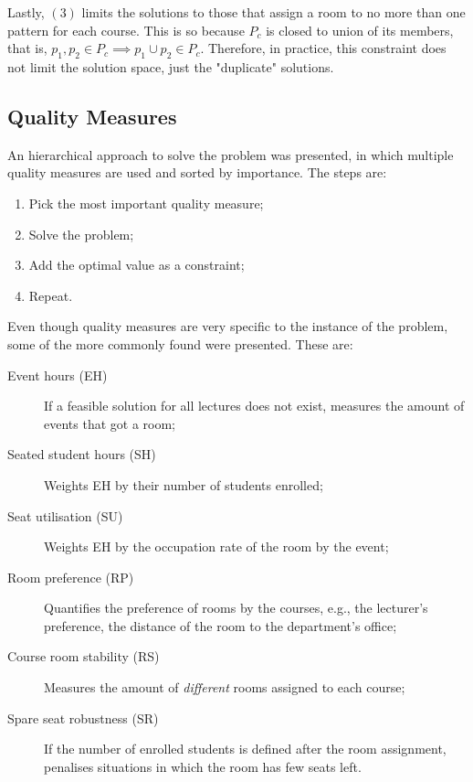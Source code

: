 Lastly, $(3)$ limits the solutions to those that assign a room to no more than one pattern for each course. This is so because $P_c$ is closed to union of its members, that is, $p_1, p_2 \in P_c \implies p_1 \cup p_2 \in P_c$. Therefore, in practice, this constraint does not limit the solution space, just the "duplicate" solutions.

\subsection{Quality Measures}

An hierarchical approach to solve the problem was presented, in which multiple quality measures are used and sorted by importance. The steps are:
\begin{enumerate}
    \item Pick the most important quality measure;
    \item Solve the problem;
    \item Add the optimal value as a constraint;
    \item Repeat.
\end{enumerate}

Even though quality measures are very specific to the instance of the problem, some of the more commonly found were presented. These are:
\begin{description}
    \item[Event hours (EH)] If a feasible solution for all lectures does not exist, measures the amount of events that got a room;
    \item[Seated student hours (SH)] Weights EH by their number of students enrolled;
    \item[Seat utilisation (SU)] Weights EH by the occupation rate of the room by the event;
    \item[Room preference (RP)] Quantifies the preference of rooms by the courses, e.g., the lecturer's preference, the distance of the room to the department's office;
    \item[Course room stability (RS)] Measures the amount of \emph{different} rooms assigned to each course;
    \item[Spare seat robustness (SR)] If the number of enrolled students is defined after the room assignment, penalises situations in which the room has few seats left.
\end{description}

